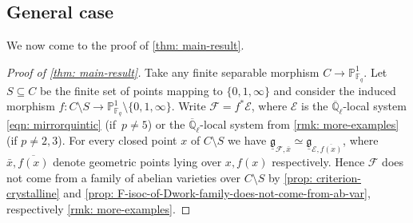\documentclass[JEP,XML,SOM,Unicode,published]{cedram}
\numberwithin{equation}{subsection}
\theoremstyle{definition}
\newcommand{\Qlbar}{\overline{\mathbb{Q}}_{\ell}}
\let\mc\mathcal
\begin{document}
\subsection{General case}
We now come to the proof of \cref{thm: main-result}.

\begin{proof}[Proof of \cref{thm: main-result}]
Take any finite separable morphism $C\to\mathbb{P}^1_{\mathbb{F}_q}$. Let $S\subseteq C$ be the finite set of points mapping to $\{0,1,\infty\}$ and consider the induced morphism $f\colon C\setminus S\to\mathbb{P}^1_{\mathbb{F}_q}\setminus\{0,1,\infty\}$. Write $\mc{F}=f^\ast\mathcal{E}$, where $\mc{E}$ is the $\Qlbar$-local system \eqref{eqn: mirrorquintic} (if~$p\neq 5$) or the $\Qlbar$-local system from \cref{rmk: more-examples} (if $p\neq 2,3$). For every closed point $x$ of $C\setminus S$ we have $\underline{\mathfrak{g}}_{\mathcal{F},\bar x}\simeq \underline{\mathfrak{g}}_{\mathcal{E},\overline{f(x)}}$, where $\bar x,\overline{f(x)}$ denote geometric points lying over $x,f(x)$ respectively. Hence $\mathcal{F}$ does not come from a family of abelian varieties over $C\setminus S$ by \cref{prop: criterion-crystalline} and \cref{prop: F-isoc-of-Dwork-family-does-not-come-from-ab-var}, respectively \cref{rmk: more-examples}.
\end{proof}

\backmatter


\end{document}
